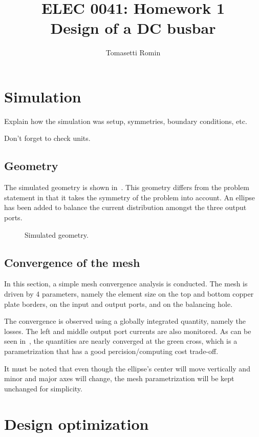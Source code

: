 \documentclass[]{article}
\title{%
    ELEC 0041: Homework 1\\
    \large Design of a DC busbar
}
\author{Tomasetti Romin}
\begin{document}
\maketitle

\section{Simulation}

Explain how the simulation was setup, symmetries, boundary conditions, etc.

Don't forget to check units.

\subsection{Geometry}

The simulated geometry is shown in~.
This geometry differs from the problem statement in that it takes the symmetry of the problem into account.
An ellipse has been added to balance the current distribution amongst the three output ports.

\begin{figure}[h]
    \centering
    
    \caption{Simulated geometry.}
    \label{figure:geometry}
\end{figure}

\subsection{Convergence of the mesh}

In this section, a simple mesh convergence analysis is conducted.
The mesh is driven by 4 parameters, namely the element size on the top and bottom copper plate borders,
on the input and output ports, and on the balancing hole.

The convergence is observed using a globally integrated quantity, namely the losses.
The left and middle output port currents are also monitored.
As can be seen in~, the quantities are nearly converged at the green cross,
which is a parametrization that has a good percision/computing cost trade-off.

It must be noted that even though the ellipse's center will move vertically and minor and major axes will change,
the mesh parametrization will be kept unchanged for simplicity.


\section{Design optimization}
\end{document}
